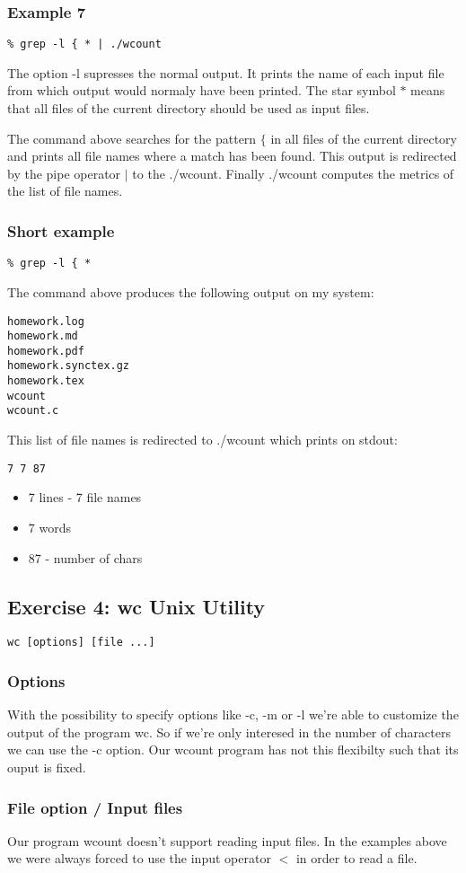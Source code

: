 \documentclass[12pt]{article}
\begin{document}
\subsubsection*{Example 7}
\begin{lstlisting}
% grep -l { * | ./wcount
\end{lstlisting}
The option -l supresses the normal output. It prints the name of each input file from which output would normaly have been printed.
The star symbol  $*$ means that all files of the current directory should be used as input files.

The command above searches for the pattern $\{$ in all files of the current directory and prints all file names where a match has been found. This output is redirected by the pipe operator $|$ to the ./wcount. Finally ./wcount computes the metrics of the list of file names.

\subsubsection*{Short example}

\begin{lstlisting}
% grep -l { * 
\end{lstlisting}
The command above produces the following output on my system:

\begin{lstlisting}
homework.log
homework.md
homework.pdf
homework.synctex.gz
homework.tex
wcount
wcount.c
\end{lstlisting}

This list of file names is redirected to ./wcount which prints on stdout:
\begin{lstlisting}
7 7 87
\end{lstlisting}
\begin{itemize}
	\item 7 lines - 7 file names
	\item 7 words
	\item 87 - number of chars
\end{itemize}

\subsection*{Exercise 4: wc Unix Utility}
\begin{lstlisting}
wc [options] [file ...]
\end{lstlisting}
\subsubsection*{Options}
With the possibility to specify options like -c, -m or -l we're able to customize the output of the program wc. 
So if we're only interesed in the number of characters we can use the -c option.
Our wcount program has not this flexibilty such that its ouput is fixed.

\subsubsection*{File option / Input files}
Our program wcount doesn't support reading input files. In the examples above we were always forced to use the input operator $<$ in order to read a file.
\end{document}
